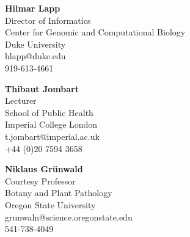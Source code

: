 \documentclass[11pt,letterpaper,sans]{moderncv} %
\begin{document}
\textbf{Hilmar Lapp}\\
Director of Informatics\\
Center for Genomic and Computational Biology\\
Duke University\\
hlapp@duke.edu\\
919-613-4661

\bigskip

\textbf{Thibaut Jombart}\\
Lecturer\\
School of Public Health\\
Imperial College London\\
t.jombart@imperial.ac.uk\\
+44 (0)20 7594 3658

\bigskip

\textbf{Niklaus Gr\"unwald}\\
Courtesy Professor\\
Botany and Plant Pathology\\
Oregon State University\\
grunwaln@science.oregonstate.edu\\
541-738-4049
\end{document}
